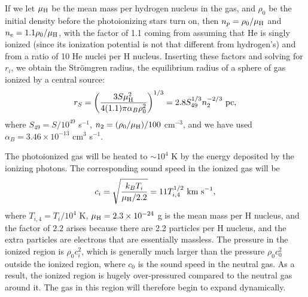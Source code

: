If we let $\mu_{\rm H}$ be the mean mass per hydrogen nucleus in the gas, and $\rho_0$ be the initial density before the photoionizing stars turn on, then $n_p = \rho_0/\mu_{\rm H}$ and $n_e = 1.1 \rho_0/\mu_{\rm H}$, with the factor of 1.1 coming from assuming that He is singly ionized (since its ionization potential is not that different from hydrogen's) and from a ratio of 10 He nuclei per H nucleus. Inserting these factors and solving for $r_i$, we obtain the Str\"omgren radius, the equilibrium radius of a sphere of gas ionized by a central source:
\begin{equation}
r_S = \left(\frac{3 S \mu_{\rm H}^2}{4(1.1) \pi \alpha_B \rho_0^2}\right)^{1/3} = 2.8 S_{49}^{1/3} n_2^{-2/3}\mbox{ pc},
\end{equation}
where $S_{49} = S/10^{49}$ s$^{-1}$, $n_2 = (\rho_0/\mu_{\rm H})/100$ cm$^{-3}$, and we have used $\alpha_B = 3.46\times 10^{-13}$ cm$^3$ s$^{-1}$.

The photoionized gas will be heated to $\sim 10^4$ K by the energy deposited by the ionizing photons. The corresponding sound speed in the ionized gas will be
\begin{equation}
c_i = \sqrt{\frac{k_B T_i}{\mu_{\rm H}/2.2}} = 11 T_{i,4}^{1/2}\mbox{ km s}^{-1},
\end{equation}
where $T_{i,4} = T_i/10^4$ K, $\mu_{\rm H} = 2.3\times 10^{-24}$ g is the mean mass per H nucleus, and the factor of $2.2$ arises because there are 2.2 particles per H nucleus, and the extra particles are electrons that are essentially massless. The pressure in the ionized region is $\rho_0 c_i^2$, which is generally much larger than the pressure $\rho_0 c_0^2$ outside the ionized region, where $c_0$ is the sound speed in the neutral gas. As a result, the ionized region is hugely over-pressured compared to the neutral gas around it. The gas in this region will therefore begin to expand dynamically.

